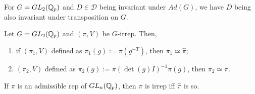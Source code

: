 \documentclass[pdf,notes]{beamer}
\theoremstyle{mystyle}
\begin{document}
\begin{frame}
	\begin{theorem}
		For $G=GL_2(\mathbb{Q}_p)$ and $D\in\mathcal{D}$ being invariant under $Ad(G)$, we have $D$ being also invariant under 
		transposition on $G$.
		\label{}
	\end{theorem}
	\begin{theorem}
		Let $G=GL_2(\mathbb{Q}_p)$ and $(\pi,V)$ be $G$-irrep. Then,
		\begin{enumerate}
			\item if $(\pi_1,V)$ defined as $\pi_1(g):=\pi(g^{-T})$, then $\pi_1\simeq\hat{\pi}$;
			\item $(\pi_2,V)$ defined as $\pi_2(g):=\pi(\det(g)I)^{-1}\pi(g)$, then $\pi_2\simeq\hat{\pi}$.
		\end{enumerate}
		\label{}
	\end{theorem}
	\begin{theorem}
		If $\pi$ is an admissible rep of $GL_n(\mathbb{Q}_p)$, then $\pi$ is irrep iff $\hat{\pi}$ is so.
		\label{}
	\end{theorem}
\end{frame}
\end{document}
